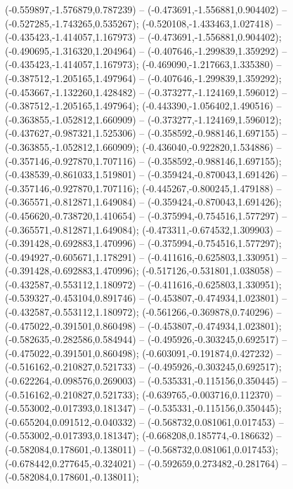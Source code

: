  (-0.559897,-1.576879,0.787239) -- (-0.473691,-1.556881,0.904402) -- (-0.527285,-1.743265,0.535267);
 (-0.520108,-1.433463,1.027418) -- (-0.435423,-1.414057,1.167973) -- (-0.473691,-1.556881,0.904402);
 (-0.490695,-1.316320,1.204964) -- (-0.407646,-1.299839,1.359292) -- (-0.435423,-1.414057,1.167973);
 (-0.469090,-1.217663,1.335380) -- (-0.387512,-1.205165,1.497964) -- (-0.407646,-1.299839,1.359292);
 (-0.453667,-1.132260,1.428482) -- (-0.373277,-1.124169,1.596012) -- (-0.387512,-1.205165,1.497964);
 (-0.443390,-1.056402,1.490516) -- (-0.363855,-1.052812,1.660909) -- (-0.373277,-1.124169,1.596012);
 (-0.437627,-0.987321,1.525306) -- (-0.358592,-0.988146,1.697155) -- (-0.363855,-1.052812,1.660909);
 (-0.436040,-0.922820,1.534886) -- (-0.357146,-0.927870,1.707116) -- (-0.358592,-0.988146,1.697155);
 (-0.438539,-0.861033,1.519801) -- (-0.359424,-0.870043,1.691426) -- (-0.357146,-0.927870,1.707116);
 (-0.445267,-0.800245,1.479188) -- (-0.365571,-0.812871,1.649084) -- (-0.359424,-0.870043,1.691426);
 (-0.456620,-0.738720,1.410654) -- (-0.375994,-0.754516,1.577297) -- (-0.365571,-0.812871,1.649084);
 (-0.473311,-0.674532,1.309903) -- (-0.391428,-0.692883,1.470996) -- (-0.375994,-0.754516,1.577297);
 (-0.494927,-0.605671,1.178291) -- (-0.411616,-0.625803,1.330951) -- (-0.391428,-0.692883,1.470996);
 (-0.517126,-0.531801,1.038058) -- (-0.432587,-0.553112,1.180972) -- (-0.411616,-0.625803,1.330951);
 (-0.539327,-0.453104,0.891746) -- (-0.453807,-0.474934,1.023801) -- (-0.432587,-0.553112,1.180972);
 (-0.561266,-0.369878,0.740296) -- (-0.475022,-0.391501,0.860498) -- (-0.453807,-0.474934,1.023801);
 (-0.582635,-0.282586,0.584944) -- (-0.495926,-0.303245,0.692517) -- (-0.475022,-0.391501,0.860498);
 (-0.603091,-0.191874,0.427232) -- (-0.516162,-0.210827,0.521733) -- (-0.495926,-0.303245,0.692517);
 (-0.622264,-0.098576,0.269003) -- (-0.535331,-0.115156,0.350445) -- (-0.516162,-0.210827,0.521733);
 (-0.639765,-0.003716,0.112370) -- (-0.553002,-0.017393,0.181347) -- (-0.535331,-0.115156,0.350445);
 (-0.655204,0.091512,-0.040332) -- (-0.568732,0.081061,0.017453) -- (-0.553002,-0.017393,0.181347);
 (-0.668208,0.185774,-0.186632) -- (-0.582084,0.178601,-0.138011) -- (-0.568732,0.081061,0.017453);
 (-0.678442,0.277645,-0.324021) -- (-0.592659,0.273482,-0.281764) -- (-0.582084,0.178601,-0.138011);
